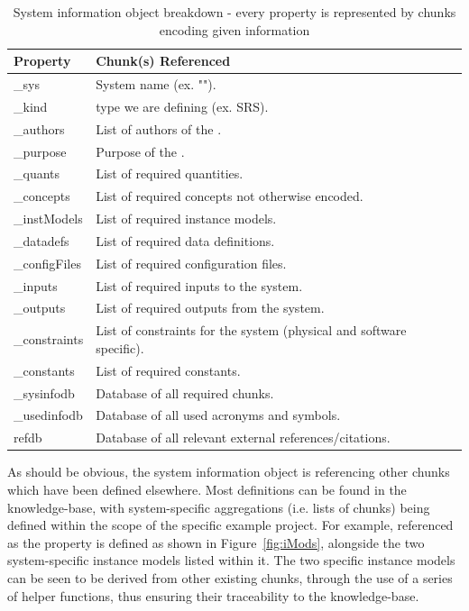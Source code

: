 \begin{table}[]
\caption{System information object breakdown - every property is represented by 
chunks encoding given information}
\label{tab:siBreakdown}
\begin{tabular}{| P{.2\linewidth} | p{.8\linewidth}|}
\hline
 \textbf{Property} & \textbf{Chunk(s) Referenced}
\\ \hline
	\_sys & System name (ex. "\gb{}").
\\ \hline
	\_kind & \SF{} type we are defining (ex. SRS).
\\ \hline
	\_authors & List of authors of the \sf{}.
\\ \hline
	\_purpose & Purpose of the \sf{}.
\\ \hline
	\_quants & List of required quantities.
\\ \hline
	\_concepts & List of required concepts not otherwise encoded.
\\ \hline
	\_instModels & List of required instance models.
\\ \hline
	\_datadefs & List of required data definitions.
\\ \hline
	\_configFiles & List of required configuration files.
\\ \hline
	\_inputs & List of required inputs to the system.
\\ \hline
	\_outputs & List of required outputs from the system.
\\ \hline
	\_constraints & List of constraints for the system (physical and software 
	specific).
\\ \hline
	\_constants & List of required constants. 
\\ \hline
	\_sysinfodb & Database of all required chunks.
\\ \hline
	\_usedinfodb & Database of all used acronyms and symbols.
\\ \hline
	refdb & Database of all relevant external references/citations.
\\ \hline
\end{tabular}
\end{table}
 
As should be obvious, the system information object is referencing other chunks 
which have been defined elsewhere. Most definitions can be found in the 
knowledge-base, with system-specific aggregations (i.e. lists of chunks) being 
defined within the scope of the specific example project. For example, 
 referenced as the  property is defined 
as shown in Figure~\ref{fig:iMods}, alongside the two system-specific instance 
models listed within it. The two specific instance models can be seen to be 
derived from other existing chunks, through the use of a series of helper 
functions, thus ensuring their traceability to the knowledge-base.


